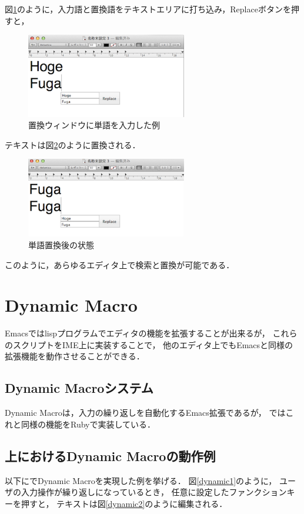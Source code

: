 図\ref{search2}のように，入力語と置換語をテキストエリアに打ち込み，Replaceボタンを押すと，

\begin{figure}[H]
\centerline{\includegraphics[width=70mm,bb=0 0 360 191]{figures/replace2.png}}
\caption{置換ウィンドウに単語を入力した例}
\label{search2}
\end{figure}


テキストは図\ref{search3}のように置換される．

\begin{figure}[H]
\centerline{\includegraphics[width=70mm,bb=0 0 360 191]{figures/replace3.png}}
\caption{単語置換後の状態}
\label{search3}
\end{figure}

このように，あらゆるエディタ上で検索と置換が可能である．

\section{Dynamic Macro}

Emacsではlispプログラムでエディタの機能を拡張することが出来るが，
これらのスクリプトをIME上に実装することで，
他のエディタ上でもEmacsと同様の拡張機能を動作させることができる．

\subsection{Dynamic Macroシステム}
Dynamic Macroは，入力の繰り返しを自動化するEmacs拡張であるが，
{\system}ではこれと同様の機能をRubyで実装している．

\subsection{\system 上におけるDynamic Macroの動作例}
以下に{\system}でDynamic Macro\cite{DynamicMacro}を実現した例を挙げる．
図\ref{dynamic1}のように，
ユーザの入力操作が繰り返しになっているとき，
任意に設定したファンクションキーを押すと，
テキストは図\ref{dynamic2}のように編集される．

